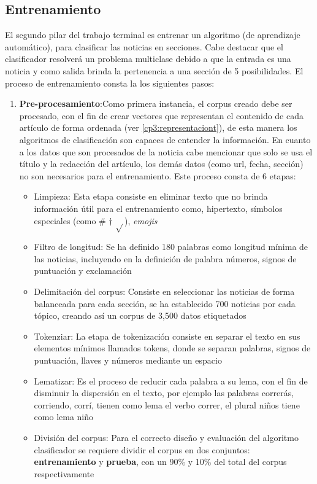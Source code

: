 \subsection{Entrenamiento}

El segundo pilar del trabajo terminal es entrenar un algoritmo (de aprendizaje automático), para clasificar las noticias en secciones. Cabe destacar que el clasificador resolverá un problema multiclase debido a que la entrada es una noticia y como salida brinda la pertenencia a una sección de 5 posibilidades. El proceso de entrenamiento consta la los siguientes pasos:\\

\begin{enumerate}
  \item \textbf{Pre-procesamiento}:Como primera instancia, el corpus creado debe ser procesado, con el fin de crear vectores que representan el contenido de cada artículo de forma ordenada (ver \ref{cp3:representaciont}), de esta manera los algoritmos de clasificación son capaces de entender la información. En cuanto a los datos que son procesados de la noticia cabe mencionar que solo se usa el título y la redacción del artículo, los demás datos (como url, fecha, sección) no son necesarios para el entrenamiento. Este proceso consta de 6 etapas: \\

  \begin{itemize}
    \item Limpieza: Esta etapa consiste en eliminar texto que no brinda información útil para el entrenamiento como, hipertexto, símbolos especiales (como \# $\dagger$ $\sqrt{ }$), \textit{emojis}
    \item Filtro de longitud: Se ha definido 180 palabras como longitud mínima de las noticias, incluyendo en la definición de palabra números, signos de puntuación y exclamación
    \item Delimitación del corpus: Consiste en seleccionar las noticias de forma balanceada para cada sección, se ha establecido 700 noticias por cada tópico, creando así un corpus de 3,500 datos etiquetados
    \item Tokenziar: La etapa de tokenización consiste en separar el texto en sus elementos mínimos llamados tokens, donde se separan palabras, signos de puntuación, llaves y números mediante un espacio
    \item Lematizar: Es el proceso de reducir cada palabra a su lema, con el fin de disminuir la dispersión en el texto, por ejemplo las palabras correrás, corriendo, corrí, tienen como lema el verbo correr, el plural niños tiene como lema niño
    \item División del corpus: Para el correcto diseño y evaluación del algoritmo clasificador se requiere dividir el corpus en dos conjuntos: \textbf{entrenamiento} y \textbf{prueba}, con un 90\% y 10\% del total del corpus respectivamente\\
  \end{itemize}


\end{enumerate}
